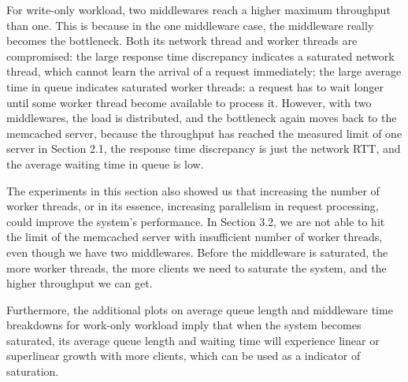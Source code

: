 For write-only workload, two middlewares reach a higher maximum throughput than one. This is because in the one middleware case, the middleware really becomes the bottleneck. Both its network thread and worker threads are compromised: the large response time discrepancy indicates a saturated network thread, which cannot learn the arrival of a request immediately; the large average time in queue indicates saturated worker threads: a request has to wait longer until some worker thread become available to process it. However, with two middlewares, the load is distributed, and the bottleneck again moves back to the memcached server, because the throughput has reached the measured limit of one server in Section 2.1, the response time discrepancy is just the network RTT, and the average waiting time in queue is low.

The experiments in this section also showed us that increasing the number of worker threads, or in its essence, increasing parallelism in request processing, could improve the system's performance. In Section 3.2, we are not able to hit the limit of the memcached server with insufficient number of worker threads, even though we have two middlewares. Before the middleware is saturated, the more worker threads, the more clients we need to saturate the system, and the higher throughput we can get.

Furthermore, the additional plots on average queue length and middleware time breakdowns for work-only workload imply that when the system becomes saturated, its average queue length and waiting time will experience linear or superlinear growth with more clients, which can be used as a indicator of saturation.
